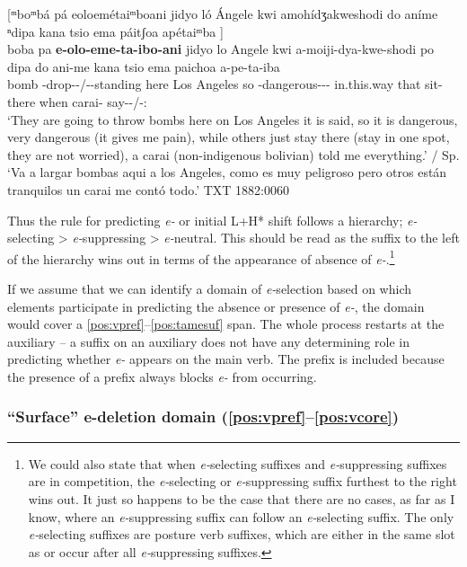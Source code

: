 \documentclass[output=paper,hidelinks]{langscibook}
\begin{document}
\ea \label{ex:eoloemetaiboani}
	  [ᵐboᵐbá pá eoloemétaiᵐboani jidyo ló Ángele kwi amohídʒakweshodi do aníme ⁿdipa kana tsio ema páitʃoa apétaiᵐba \downarrow] \\
       \gll boba pa \textbf{e-olo-eme-ta-ibo-ani} jidyo lo Angele kwi a-moiji-dya-kwe-shodi po dipa do ani-me kana tsio ema	paichoa a-pe-ta-iba \\
	     bomb \Rep{} \E{}-drop-\Caus{}-\Third\Aarg{}/\Tpl{}-\Final{}-standing here Los Angeles so \Adj{}-dangerous-\Intens-\Aug{}-\Emot{} \Rel{} in.this.way that sit-there \Tpl{} when \Fsg{} carai-\Erg{} say-\Compl{}-\Third\Aarg{}/\Tpl{}-\Final{}:\Pst{}    \\
    \glt `They are going to throw bombs here on Los Angeles it is said, so it is dangerous, very dangerous (it gives me pain), while others just stay there (stay in one spot, they are not worried), a carai (non-indigenous bolivian) told me everything.' / Sp. `Va a largar bombas aqui a los Angeles, como es muy peligroso pero otros están tranquilos un carai me contó todo.' TXT 1882:0060
\z

Thus the rule for predicting \textit{e-} or initial L+H* shift follows a hierarchy; \textit{e-}selecting > \textit{e-}suppressing > \textit{e-}neutral. This should be read as the suffix to the left of the hierarchy wins out in terms of the appearance of absence of \textit{e-}.\footnote{We could also state that when \textit{e-}selecting suffixes and \textit{e-}suppressing suffixes are in competition, the \textit{e-}selecting or \textit{e-}suppressing suffix furthest to the right wins out. It just so happens to be the case that there are no cases, as far as I know, where an \textit{e-}suppressing suffix can follow an \textit{e-}selecting suffix. The only \textit{e-}selecting suffixes are posture verb suffixes, which are either in the same slot as or occur after all \textit{e-}suppressing suffixes.} 

If we assume that we can identify a domain of \textit{e-}selection based on which elements participate in predicting the absence or presence of \textit{e-}, the domain would cover a \ref{pos:vpref}--\ref{pos:tamesuf} span. The whole process restarts at the auxiliary -- a suffix on an auxiliary does not have any determining role in predicting whether \textit{e-} appears on the main verb. The prefix is included because the presence of a prefix always blocks \textit{e-} from occurring.

\subsubsection{``Surface'' e-deletion domain (\ref{pos:vpref}--\ref{pos:vcore})}
\end{document}
